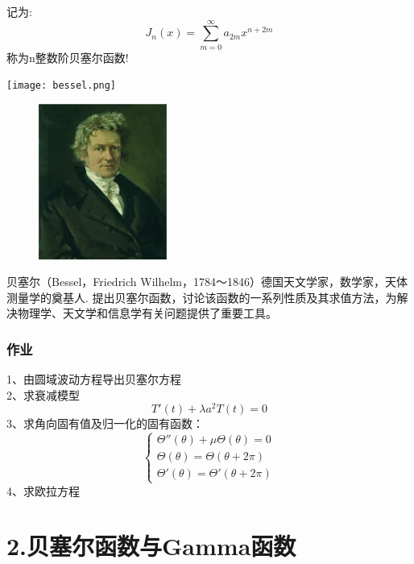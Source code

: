 \begin{frame}
	记为: \[\boxed{J_n(x) = \sum\limits_{m=0}^{\infty} a_{2m} x^{n+2m}} 
		 \]
	称为n整数阶贝塞尔函数! 
\end{frame}	

\begin{frame}
	\centering
	\texttt{[image: bessel.png]}
\end{frame}	

\begin{frame}
	\begin{center}
		\begin{figure}
			\includegraphics[width=4.2cm]{figs/fig1-3-6.png}	
		\end{figure}
	\end{center}
	贝塞尔（Bessel，Friedrich Wilhelm，1784～1846）德国天文学家，数学家，天体测量学的奠基人.
	提出贝塞尔函数，讨论该函数的一系列性质及其求值方法，为解决物理学、天文学和信息学有关问题提供了重要工具。
\end{frame}

\begin{frame}
	\frametitle{作业}
	1、由圆域波动方程导出贝塞尔方程\\
	2、求衰减模型
	\begin{equation*}
		T'(t)+\lambda a^2T(t)=0  
	\end{equation*}
	3、求角向固有值及归一化的固有函数：\\
	\[ \begin{cases}
		\Theta ''(\theta)+\mu \Theta (\theta) =0 \\
		\Theta (\theta) =	\Theta (\theta+2\pi)  \\
		\Theta' (\theta) =	\Theta' (\theta+2\pi)  
	\end{cases}  \]	
	4、求欧拉方程
\end{frame}	

\section{2.贝塞尔函数与Gamma函数}

